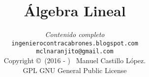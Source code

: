 








\title{\centering \huge \bfseries Álgebra Lineal}
\author{
	\emph{\centering Contenido completo}\\[1.5 cm]
 	\texttt{ingenierocontracabrones.blogspot.com}\\[0.5 cm]
	\texttt{mclnaranjito@gmail.com}\\[4 cm]
	\small{Copyright \copyright \ (2016 - \the\year) \ Manuel Castillo López.} \\
	\small{GPL GNU General Public License}\\[0.5 cm]
	}


	\renewcommand{\onlyinsubfile}[1]{}
	\renewcommand{\notinsubfile}[1]{#1}

\frontmatter

\maketitle
\tableofcontents
{}

\mainmatter










\appendix





 
